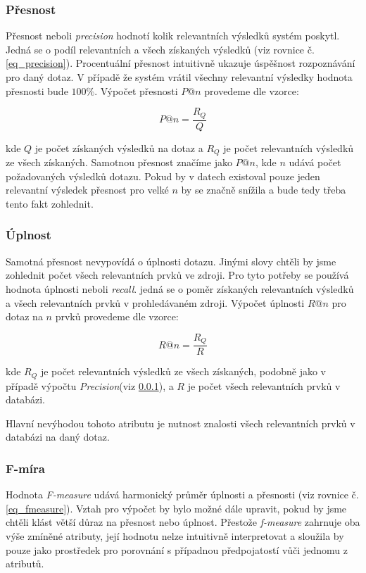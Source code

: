\documentclass[12pt]{article}
\begin{document}
\subsubsection{Přesnost}
\label{met_precision}
Přesnost neboli \textit{precision} hodnotí kolik relevantních výsledků systém poskytl. Jedná se o podíl relevantních a všech získaných výsledků (viz rovnice č. \ref{eq_precision}). Procentuální přesnost intuitivně ukazuje úspěšnost rozpoznávání pro daný dotaz. V případě že systém vrátil všechny relevantní výsledky hodnota přesnosti bude $100\%$. Výpočet přesnosti $P@n$ provedeme dle vzorce:

\begin{equation}
\label{eq_precision}
P@n=\frac{ { R }_{ Q } }{ Q }
\end{equation}

kde $Q$ je počet získaných výsledků na dotaz a $R_Q$ je počet relevantních výsledků ze všech získaných. Samotnou přesnost značíme jako $P@n$, kde $n$ udává počet požadovaných výsledků dotazu. Pokud by v datech existoval pouze jeden relevantní výsledek přesnost pro velké $n$ by se značně snížila a bude tedy třeba tento fakt zohlednit.

\subsubsection{Úplnost}
\label{met_recall}
Samotná přesnost nevypovídá o úplnosti dotazu. Jinými slovy chtěli by jsme zohlednit počet všech relevantních prvků ve zdroji. Pro tyto potřeby se používá hodnota úplnosti neboli \textit{recall}. jedná se o poměr získaných relevantních výsledků a všech relevantních prvků v prohledávaném zdroji. Výpočet úplnosti $R@n$ pro dotaz na $n$ prvků provedeme dle vzorce:

\begin{equation}
\label{eq_recall}
R@n=\frac{ { R }_{ Q } }{ R }
\end{equation}

kde $R_Q$ je počet relevantních výsledků ze všech získaných, podobně jako v případě výpočtu \textit{Precision}(viz \ref{met_precision}), a $R$ je počet všech relevantních prvků v databázi.

Hlavní nevýhodou tohoto atributu je nutnost znalosti všech relevantních prvků v databázi na daný dotaz.

\subsubsection{F-míra}
Hodnota \textit{F-measure}\cite{Metrics_fmeasure} udává harmonický průměr úplnosti a přesnosti (viz rovnice č.\ref{eq_fmeasure}). Vztah pro výpočet by bylo možné dále upravit, pokud by jsme chtěli klást větší důraz na přesnost nebo úplnost. Přestože \textit{f-measure} zahrnuje oba výše zmíněné atributy, její hodnotu nelze intuitivně interpretovat a sloužila by pouze jako prostředek pro porovnání s případnou předpojatostí vůči jednomu z atributů.
\end{document}
